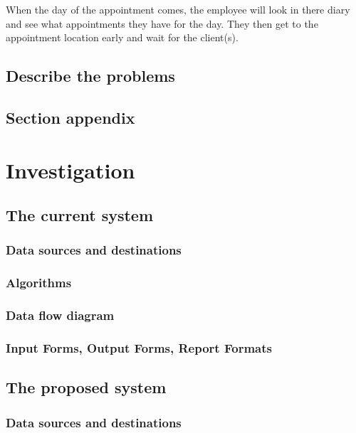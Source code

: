 When the day of the appointment comes, the employee will look in there diary and see what appointments they have for the day. They then get to the appointment location early and wait for the client(s).


\subsection{Describe the problems}

\subsection{Section appendix}

\section{Investigation}

\subsection{The current system}

\subsubsection{Data sources and destinations}

\subsubsection{Algorithms}

\subsubsection{Data flow diagram}

\subsubsection{Input Forms, Output Forms, Report Formats}

\subsection{The proposed system}

\subsubsection{Data sources and destinations}

